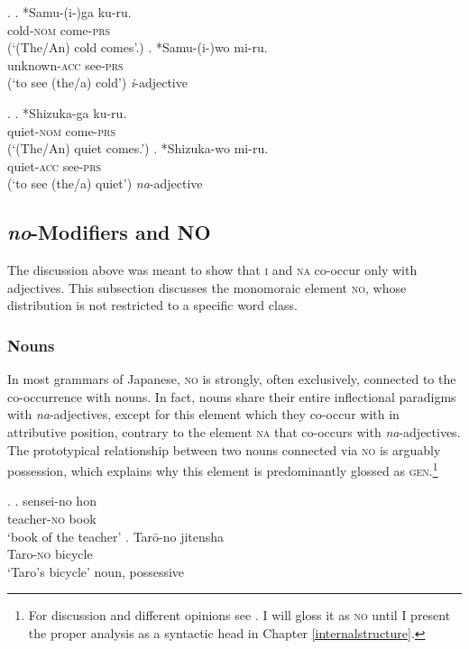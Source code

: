 \documentclass [output=book,colorlinks,citecolor=brown]{langscibook}
\begin{document}
\ex. \ag. *Samu-(i-)ga ku-ru.\\
cold-\textsc{nom} come-\textsc{prs}\\
(`(The/An) cold comes’.)
\bg. *Samu-(i-)wo mi-ru.\\
unknown-\textsc{acc} see-\textsc{prs}\\
(`to see (the/a) cold’) \null \hfill \textit{i}-adjective


\ex. \ag. *Shizuka-ga ku-ru.\\
quiet-\textsc{nom} come-\textsc{prs}\\
(`(The/An) quiet comes.’)
\bg. *Shizuka-wo mi-ru.\\
quiet-\textsc{acc} see-\textsc{prs}\\
(`to see (the/a) quiet’) \null \hfill \textit{na}-adjective

\subsection{\textit{no}-Modifiers and \textsc{NO}}

The discussion above was meant to show that \textsc{i} and \textsc{na} co-occur only with adjectives. This subsection discusses the monomoraic element \textsc{no}, whose distribution is not restricted to a specific word class.

\subsubsection{Nouns}

In most grammars of Japanese, \textsc{no} is strongly, often exclusively, connected to the co-occurrence with nouns. In fact, nouns share their entire inflectional paradigms with \textit{na}-adjectives, except for this element which they co-occur with in attributive position, contrary to the element \textsc{na} that co-occurs with \textit{na}-adjectives. The prototypical relationship between two nouns connected via \textsc{no} is arguably possession, which explains why this element is predominantly glossed as \textsc{gen}.\footnote{For discussion and different opinions see \citet{murasugi:1991:noun, uehara:1998:syntactic, backhouse:2004:inflected}. I will gloss it as \textsc{no} until I present the proper analysis as a syntactic head in Chapter \ref{internalstructure}.} %

\ex. \label{senseino} \ag. sensei-no hon\\
teacher-\textsc{no} book\\
`book of the teacher'
\bg. Tarō-no jitensha\\
Taro-\textsc{no} bicycle\\
`Taro’s bicycle’ \null \hfill noun, possessive
\end{document}
